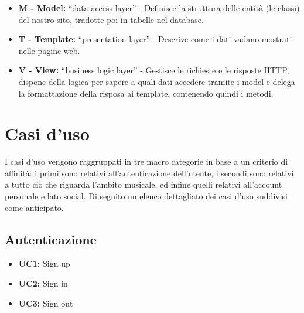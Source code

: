     

   
\begin{itemize}
    \item \textbf{M - Model:} “data access layer” - Definisce la struttura delle entità (le classi) del nostro sito, tradotte 
    poi in tabelle nel database.
    \item \textbf{T - Template:} “presentation layer” - Descrive come i dati vadano mostrati nelle pagine web.
    \item \textbf{V - View:} “business logic layer” - Gestisce le richieste e le risposte HTTP, dispone della 
    logica per sapere a quali dati accedere tramite i model e delega la formattazione della risposa ai template, contenendo quindi i metodi. 
\end{itemize}
    
    
\newpage

\section{Casi d'uso}
I casi d'uso vengono raggruppati in tre macro categorie in base a un criterio di affinità:
i primi sono relativi all'autenticazione dell'utente, i secondi sono relativi a tutto
ciò che riguarda l'ambito musicale, ed infine quelli relativi all'account personale e lato social. 
Di seguito un elenco dettagliato dei casi d'uso suddivisi come anticipato.

\subsection{Autenticazione}
    \begin{itemize}
        \item \textbf{UC1:} Sign up 
        \item \textbf{UC2:} Sign in
        \item \textbf{UC3:} Sign out 
    \end{itemize}


